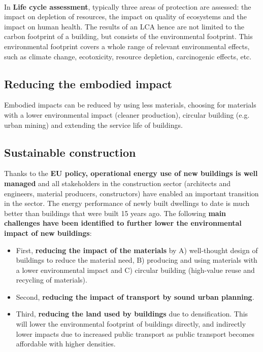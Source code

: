 \documentclass[../summary.tex]{subfiles}
\begin{document}
	\ \\
	In \textbf{Life cycle assessment}, typically three areas of protection are assessed: the impact on depletion of resources, the impact on quality of ecosystems and the impact on human health. The results of an LCA hence are not limited to the carbon footprint of a building, but consists of the environmental footprint. This environmental footprint covers a whole range of relevant environmental effects, such as climate change, ecotoxicity, resource depletion, carcinogenic effects, etc.
	
	\subsection{Reducing the embodied impact}
	
	Embodied impacts can be reduced by using less materials, choosing for materials with a lower environmental impact (cleaner production),
	circular building (e.g. urban mining) and extending the service life of buildings.
	\newpage
	\subsection{Sustainable construction}
	
	Thanks to the \textbf{EU policy, operational energy use of new buildings is well managed} and all stakeholders in the construction sector (architects and engineers, material producers, constructors) have enabled an important transition in the sector. The energy performance of newly built dwellings to date is much better than buildings that were built 15 years ago. The following \textbf{main challenges have been identified to further lower the environmental impact of new buildings}:
	\begin{itemize}
		\item First, \textbf{reducing the impact of the materials} by A) well-thought design of buildings to reduce the material need, B) producing and using materials with a lower environmental impact and C) circular building (high-value reuse and recycling of materials).
		\item Second, \textbf{reducing the impact of transport by sound urban planning}.
		\item Third, \textbf{reducing the land used by buildings} due to densification. This will lower the environmental footprint of buildings directly, and indirectly lower impacts due to increased public transport as public transport becomes affordable with higher densities.
	\end{itemize}
	
\end{document}

